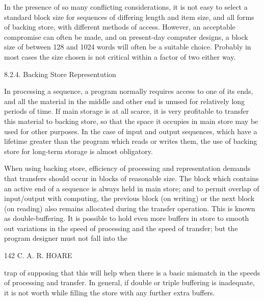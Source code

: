 {{{{				In the presence of so many conflicting considerations, it is not easy to select a standard block size for sequences of differing length and item size, and all forms of backing store, with different methods of access. However, an acceptable compromise can often be made, and on present-day computer designs, a block size of between 128 and 1024 words will often be a suitable choice. Probably in most cases the size chosen is not critical within a factor of two either way.
				
				8.2.4. Backing Store Representution
				
				In processing a sequence, a program normally requires access to one of its ends, and all the material in the middle and other end is unused for relatively long periods of time. If main storage is at all scarce, it is very profitable to transfer this material to backing store, so that the space it occupies in main store may be used for other purposes. In the case of input and output sequences, which have a lifetime greater than the program which reads or writes them, the use of backing store for long-term storage is almost obligatory.
				
				When using backing store, efficiency of processing and representation demands that transfers should occur in blocks of reasonable size. The block which contains an active end of a sequence is always held in main store; and to permit overlap of input/output with computing, the previous block (on writing) or the next block (on reading) also remains allocated during the transfer operation. This is known as double-buffering. It is possible to hold even more buffers in store to smooth out variations in the speed of processing and the speed of transfer; but the program designer must not fall into the
				
				142 C. A. R. HOARE
				
				trap of supposing that this will help when there is a basic mismatch in the speeds of processing and transfer. In general, if double or triple buffering is inadequate, it is not worth while filling the store with any further extra buffers.
				
}}}}

